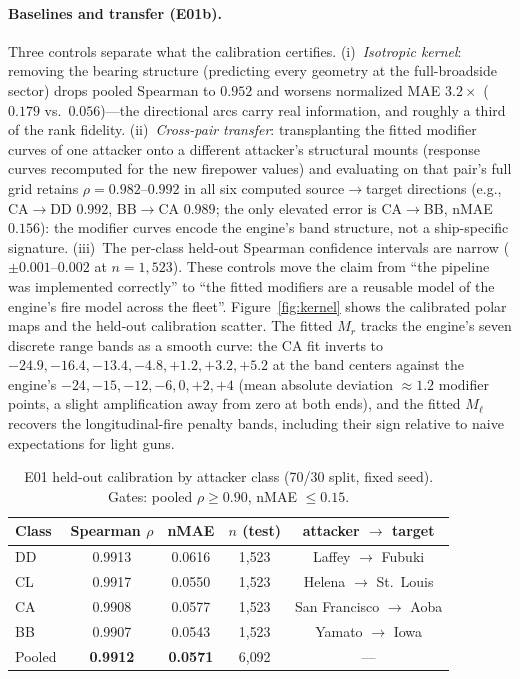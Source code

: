 \documentclass[12pt,a4paper]{article}
\begin{document}
\paragraph{Baselines and transfer (E01b).}  Three controls separate what
the calibration certifies.  (i)~\emph{Isotropic kernel}: removing the
bearing structure (predicting every geometry at the full-broadside sector)
drops pooled Spearman to $0.952$ and worsens normalized MAE $3.2\times$
($0.179$ vs.\ $0.056$)---the directional arcs carry real information, and
roughly a third of the rank fidelity.  (ii)~\emph{Cross-pair transfer}:
transplanting the fitted modifier curves of one attacker onto a different
attacker's structural mounts (response curves recomputed for the new
firepower values) and evaluating on that pair's full grid retains
$\rho = 0.982$--$0.992$ in all six computed source$\to$target directions
(e.g., CA$\to$DD $0.992$, BB$\to$CA $0.989$; the only elevated error is
CA$\to$BB, nMAE $0.156$): the modifier curves encode the engine's band
structure, not a ship-specific signature.  (iii)~The per-class held-out
Spearman confidence intervals are narrow ($\pm0.001$--$0.002$ at
$n{=}1{,}523$).  These controls move the claim from ``the pipeline was
implemented correctly'' to ``the fitted modifiers are a reusable model of
the engine's fire model across the fleet''.
Figure~\ref{fig:kernel} shows the
calibrated polar maps and the held-out calibration scatter.  The fitted
$M_r$ tracks the engine's seven discrete range bands as a smooth curve:
the CA fit inverts to $-24.9, -16.4, -13.4, -4.8, +1.2, +3.2, +5.2$ at the
band centers against the engine's $-24, -15, -12, -6, 0, +2, +4$ (mean
absolute deviation $\approx1.2$ modifier points, a slight amplification
away from zero at both ends), and the fitted $M_\ell$ recovers the
longitudinal-fire penalty bands, including their sign relative to naive
expectations for light guns.

\begin{table}[t]
\centering\small
\caption{E01 held-out calibration by attacker class (70/30 split, fixed
seed).  Gates: pooled $\rho\ge0.90$, nMAE $\le0.15$.}
\label{tab:e01}
\begin{tabular}{lcccc}
\toprule
Class & Spearman $\rho$ & nMAE & $n$ (test) & attacker $\to$ target \\
\midrule
DD & 0.9913 & 0.0616 & 1{,}523 & Laffey $\to$ Fubuki \\
CL & 0.9917 & 0.0550 & 1{,}523 & Helena $\to$ St.\ Louis \\
CA & 0.9908 & 0.0577 & 1{,}523 & San Francisco $\to$ Aoba \\
BB & 0.9907 & 0.0543 & 1{,}523 & Yamato $\to$ Iowa \\
\midrule
Pooled & \textbf{0.9912} & \textbf{0.0571} & 6{,}092 & --- \\
\bottomrule
\end{tabular}
\end{table}
\end{document}
